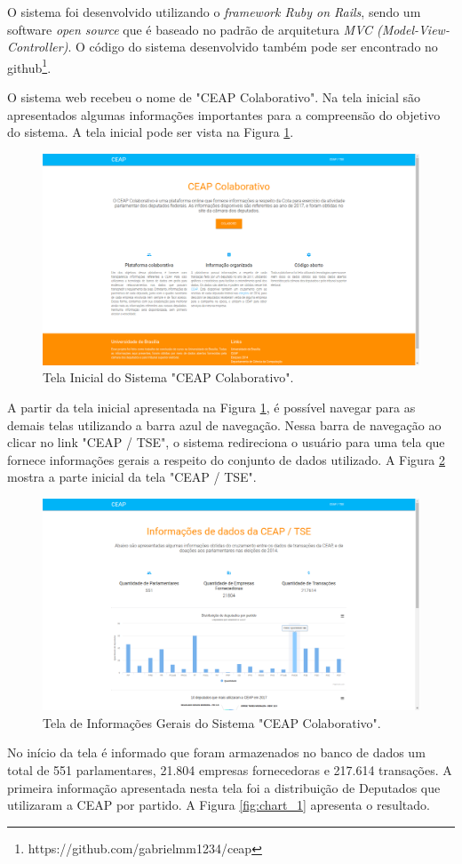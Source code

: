 \documentclass[12pt]{article}
\begin{document}
O sistema foi desenvolvido utilizando o \textit{framework Ruby on Rails}, sendo um software \textit{open source} que é baseado no padrão de arquitetura \textit{MVC (Model-View-Controller)}. O código do sistema desenvolvido também pode ser encontrado no github\footnote{https://github.com/gabrielmm1234/ceap}.

O sistema web recebeu o nome de "CEAP Colaborativo". Na tela inicial são apresentados algumas informações importantes para a compreensão do objetivo do sistema. A tela inicial pode ser vista na Figura \ref{fig:sistema_ceap}.

\begin{figure}[ht]
\centering
\includegraphics[width=.5\textwidth]{sistema_ceap.png}
\caption{Tela Inicial do Sistema "CEAP Colaborativo".}
\label{fig:sistema_ceap}
\end{figure}

A partir da tela inicial apresentada na Figura \ref{fig:sistema_ceap}, é possível navegar para as demais telas utilizando a barra azul de navegação. Nessa barra de navegação ao clicar no link "CEAP / TSE", o sistema redireciona o usuário para uma tela que fornece informações gerais a respeito do conjunto de dados utilizado. A Figura \ref{fig:sistema_ceap_tse} mostra a parte inicial da tela "CEAP / TSE".

\begin{figure}[ht]
\centering
\includegraphics[width=.6\textwidth]{ceap-tse.png}
\caption{Tela de Informações Gerais do Sistema "CEAP Colaborativo".}
\label{fig:sistema_ceap_tse}
\end{figure}

No início da tela é informado que foram armazenados no banco de dados um total de 551 parlamentares, 21.804 empresas fornecedoras e 217.614 transações.
A primeira informação apresentada nesta tela foi a distribuição de Deputados que utilizaram a CEAP por partido. A Figura \ref{fig:chart_1} apresenta o resultado.
\end{document}
